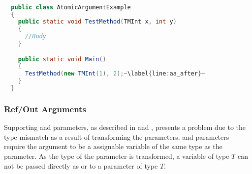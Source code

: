 \begin{lstlisting}[label=lst:after_atomic_argument,
  caption={\bscode{atomic} Argument After Transformation},
  language=Java,  
  showspaces=false,
  showtabs=false,
  breaklines=true,
  showstringspaces=false,
  breakatwhitespace=true,
  escapechar=~,
  commentstyle=\color{greencomments},
  keywordstyle=\color{bluekeywords},
  stringstyle=\color{redstrings},
  morekeywords={atomic, retry, orelse, var, get, set, ret, out}]  % Start your code-block

  public class AtomicArgumentExample
  {
    public static void TestMethod(TMInt x, int y)
    {
      //Body
    }

    public static void Main()
    {
      TestMethod(new TMInt(1), 2);~\label{line:aa_after}~
    }
  }
\end{lstlisting}

\subsubsection{Ref/Out Arguments}
Supporting   and  parameters, as described in  and , presents a problem due to the type mismatch as a result of transforming the parameters.  and  parameters require the argument to be a assignable variable of the same type as the parameter. As the type of the parameter is transformed, a variable of type $T$ can not be passed directly as  or  to a  parameter of type $T$.

